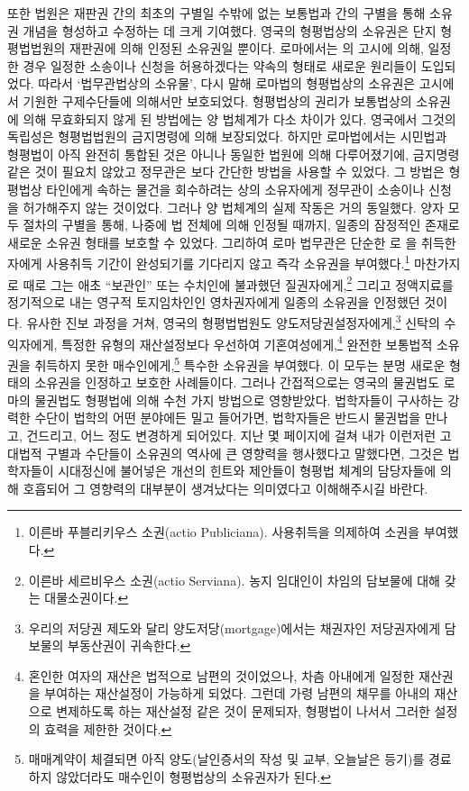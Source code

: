 또한 법원은
재판권 간의 최초의 구별일 수밖에 없는
보통법과  간의 구별을 통해
소유권 개념을 형성하고 수정하는 데
크게 기여했다.
영국의 형평법상의 소유권은 단지
형평법법원의 재판권에 의해 인정된 소유권일 뿐이다.
로마에서는
의 고시에 의해,
일정한 경우 일정한 소송이나 신청을 허용하겠다는 약속의 형태로
새로운 원리들이 도입되었다.
따라서 `법무관법상의 소유물',
다시 말해 로마법의 형평법상의 소유권은
고시에서 기원한 구제수단들에 의해서만 보호되었다.
형평법상의 권리가 보통법상의 소유권에 의해
무효화되지 않게 된 방법에는 양 법체계가 다소 차이가 있다.
영국에서 그것의 독립성은 형평법법원의
금지명령에 의해 보장되었다.
하지만 로마법에서는
시민법과 형평법이
아직 완전히 통합된 것은 아니나
동일한 법원에 의해 다루어졌기에,
금지명령 같은 것이 필요치 않았고
정무관은 보다 간단한 방법을 사용할 수 있었다.
그 방법은 형평법상 타인에게 속하는 물건을 회수하려는
상의 소유자에게 정무관이 소송이나 신청을 허가해주지 않는 것이었다.
그러나 양 법체계의 실제 작동은 거의 동일했다.
양자 모두 절차의 구별을 통해,
나중에 법 전체에 의해 인정될 때까지,
일종의 잠정적인 존재로 새로운 소유권 형태를
보호할 수 있었다.
그리하여
로마 법무관은
단순한 로 을 취득한 자에게
사용취득 기간이 완성되기를 기다리지 않고
즉각 소유권을 부여했다.\footnote{%
  이른바 푸블리키우스 소권(actio Publiciana).
  사용취득을 의제하여 소권을 부여했다. }
마찬가지로 때로 그는
애초 ``보관인'' 또는
수치인에 불과했던
질권자에게,\footnote{%
  이른바 세르비우스 소권(actio Serviana).
  농지 임대인이 차임의 담보물에 대해 갖는 대물소권이다.
  }
그리고 정액지료를 정기적으로 내는 영구적 토지임차인인
영차권자에게
일종의 소유권을 인정했던 것이다.
유사한 진보 과정을 거쳐,
영국의 형평법법원도
양도저당권설정자에게,\footnote{%
  우리의 저당권 제도와 달리 양도저당(mortgage)에서는
  채권자인 저당권자에게 담보물의 부동산권이 귀속한다. }
신탁의 수익자에게,
특정한 유형의 재산설정보다 우선하여 기혼여성에게,\footnote{%
  혼인한 여자의 재산은 법적으로 남편의 것이었으나,
  차츰 아내에게 일정한 재산권을 부여하는 재산설정이 가능하게 되었다.
  그런데 가령 남편의 채무를 아내의 재산으로 변제하도록 하는 재산설정 같은 것이
  문제되자, 형평법이 나서서 그러한 설정의 효력을 제한한 것이다.
  }
완전한 보통법적 소유권을 취득하지 못한 매수인에게,\footnote{%
  매매계약이 체결되면
  아직 양도(날인증서의 작성 및 교부, 오늘날은 등기)를 경료하지 않았더라도
  매수인이 형평법상의 소유권자가 된다. }
특수한 소유권을 부여했다.
이 모두는 분명 새로운 형태의 소유권을 인정하고 보호한 사례들이다.
그러나
간접적으로는
영국의 물권법도 로마의 물권법도
형평법에 의해 수천 가지 방법으로 영향받았다.
법학자들이 구사하는 강력한 수단이
법학의 어떤 분야에든
밀고 들어가면,
법학자들은
반드시
물권법을 만나고, 건드리고, 어느 정도 변경하게 되어있다.
지난 몇 페이지에 걸쳐
내가
이런저런 고대법적 구별과 수단들이
소유권의 역사에 큰 영향력을 행사했다고
말했다면,
그것은
법학자들이
시대정신에
불어넣은 개선의 힌트와 제안들이
형평법 체계의 담당자들에 의해 호흡되어
그 영향력의 대부분이 생겨났다는
의미였다고 이해해주시길 바란다.

